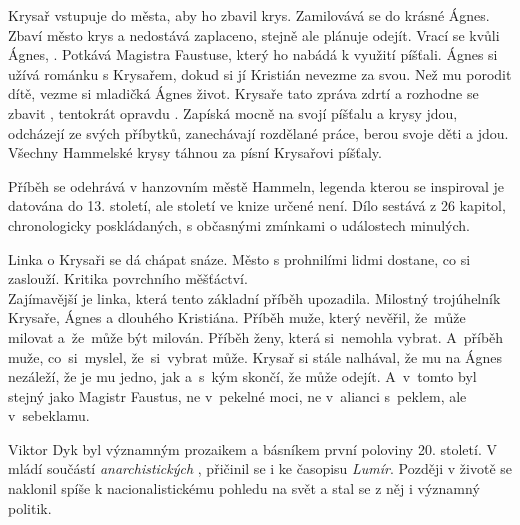 \documentclass[FGBook.tex]{subfiles}
\begin{document}
\noindent Krysař vstupuje do města, aby ho zbavil krys.
Zamilovává se do krásné Ágnes.
Zbaví město krys a nedostává zaplaceno, stejně ale plánuje odejít.
Vrací se kvůli Ágnes, .
Potkává Magistra Faustuse, který ho nabádá k využití píšťali.
Ágnes si užívá románku s Krysařem, dokud si jí Kristián nevezme za svou.
Než mu porodit dítě, vezme si mladičká Ágnes život.
Krysaře tato zpráva zdrtí a rozhodne se zbavit , tentokrát opravdu .
Zapíská mocně na svojí píšťalu a krysy jdou, odcházejí ze svých příbytků, zanechávají rozdělané práce, berou svoje děti a jdou.
Všechny Hammelské krysy táhnou za písní Krysařovi píšťaly.

\noindent 
Příběh se odehrává v hanzovním městě Hammeln, legenda kterou se  inspiroval je datována do 13. století, ale století ve knize určené není.
Dílo sestává z 26 kapitol, chronologicky poskládaných, s občasnými zmínkami o událostech minulých.

\noindent 
Linka o Krysaři se dá chápat snáze.
Město s prohnilími lidmi dostane, co si zaslouží.
Kritika povrchního měšťáctví.\\
Zajímavější je linka, která tento základní příběh upozadila.
Milostný trojúhelník Krysaře, Ágnes a dlouhého Kristiána.
Příběh muže, který nevěřil, že~může milovat a~že~může být milován.
Příběh ženy, která si~nemohla vybrat.
A~příběh muže, co~si~myslel, že~si~vybrat může.
Krysař si stále nalhával, že mu na Ágnes nezáleží, že je mu jedno, jak a~s~kým skončí, že může odejít.
A~v~tomto byl stejný jako Magistr Faustus, ne v~pekelné moci, ne v~alianci s~peklem, ale v~sebeklamu.

\vspace*{2em}





\noindent Viktor Dyk byl významným prozaikem a básníkem první poloviny 20. století.
V mládí součástí \textit{anarchistických }, přičinil se i ke časopisu \textit{Lumír}.
Později v životě se naklonil spíše k nacionalistickému pohledu na svět a stal se z něj i významný politik.
\end{document}
